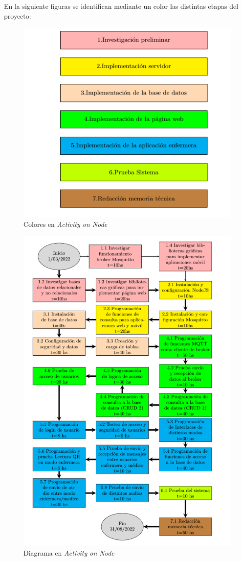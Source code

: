 \documentclass[
11pt, %
]{charter}
\begin{document}

En la siguiente figuras se identifican mediante un color las distintas etapas del proyecto:

\begin{figure}
\centering 
\includegraphics[width=.8\textwidth]{./Figuras/AoN-2.png}
\caption{Colores en \textit{Activity on Node}}
\label{fig:AoN0}
\end{figure}


\begin{figure}[htpb]
\centering 
\includegraphics[width=.8\textwidth]{./Figuras/diagramaAoN.png}
\caption{Diagrama en \textit{Activity on Node}}
\label{fig:AoN}
\end{figure}
\end{document}
